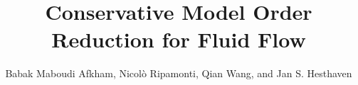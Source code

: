 \documentclass[graybox]{svmult}
\begin{document}
\title*{Conservative Model Order Reduction for Fluid Flow}
\author{Babak Maboudi Afkham, Nicol\`o Ripamonti, Qian Wang, and Jan S. Hesthaven}
%
%
\maketitle


\end{document}
